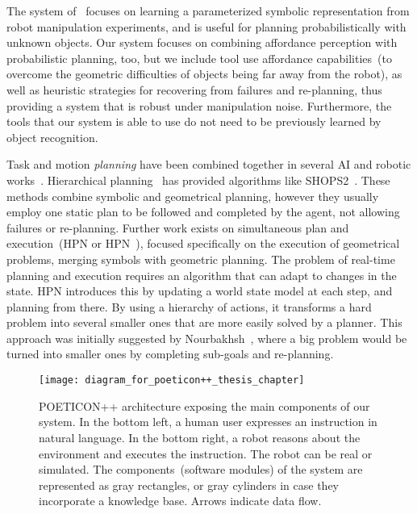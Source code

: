 The system of~\cite{ugur:2015:icra,ugur:2015:humanoids} focuses on learning a parameterized symbolic representation from robot manipulation experiments, and is useful for planning probabilistically with unknown objects.
Our system focuses on combining affordance perception with probabilistic planning, too, but we include tool use affordance capabilities~(to overcome the geometric difficulties of objects being far away from the robot), as well as heuristic strategies for recovering from failures and re-planning, thus providing a system that is robust under manipulation noise.
Furthermore, the tools that our system is able to use do not need to be previously learned by object recognition.

Task and motion \emph{planning} have been combined together in several \ac{AI} and robotic works~\cite{lozano:1987:icra,srivastava:2014:icra}.
Hierarchical planning~\cite{nourbakhsh:1998:wac} has provided algorithms like SHOPS2~\cite{goldman:2009:icaps,wolfe:2010:icaps}.
These methods combine symbolic and geometrical planning, however they usually employ one static plan to be followed and completed by the agent, not allowing failures or re-planning.
Further work exists on simultaneous plan and execution~(\acl{HPN} or \acs{HPN}~\cite{pasula:2007:jair,kaelbling:2011:icra}), focused specifically on the execution of geometrical problems, merging symbols with geometric planning.
The problem of real-time planning and execution requires an algorithm that can adapt to changes in the state.
\acs{HPN} introduces this by updating a world state model at each step, and planning from there.
By using a hierarchy of actions, it transforms a hard problem into several smaller ones that are more easily solved by a planner.
This approach was initially suggested by Nourbakhsh~\cite{nourbakhsh:1998:wac}, where a big problem would be turned into smaller ones by completing sub-goals and re-planning.

\begin{figure*}
\centering
\texttt{[image: diagram\_for\_poeticon++\_thesis\_chapter]}
\caption[POETICON++ architecture exposing the main components of our system.]{POETICON++ architecture exposing the main components of our system.
In the bottom left, a human user expresses an instruction in natural language.
In the bottom right, a robot reasons about the environment and executes the instruction.
The robot can be real or simulated.
The components~(software modules) of the system are represented as gray rectangles, or gray cylinders in case they incorporate a knowledge base.
Arrows indicate data flow.}
\label{fig:poeticon++_diagram}
\end{figure*}

